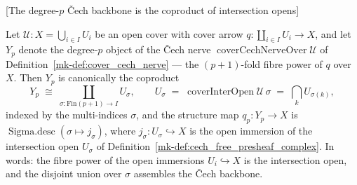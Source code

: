 \begin{lemma}

[The degree-\(p\) {\v C}ech backbone is the coproduct of intersection opens]
  \label{mk-lem:cech_backbone_left_sigma}

  Let \(\mathcal{U} : X = \bigcup_{i \in I} U_i\) be an open cover with cover arrow
  \(q : \coprod_{i \in I} U_i \to X\), and let \(Y_p\) denote the degree-\(p\) object of the
  {\v C}ech nerve \(\operatorname{coverCechNerveOver}\mathcal{U}\) of
  Definition~\ref{mk-def:cover_cech_nerve} --- the \((p+1)\)-fold fibre power of \(q\) over
  \(X\). Then \(Y_p\) is canonically the coproduct
  \[
    Y_p \;\cong\; \coprod_{\sigma : \mathrm{Fin}(p+1) \to I} U_\sigma,
    \qquad
    U_\sigma \;=\; \operatorname{coverInterOpen}\mathcal{U}\,\sigma \;=\;
      \bigcap_{k} U_{\sigma(k)},
  \]
  indexed by the multi-indices \(\sigma\), and the structure map \(q_p : Y_p \to X\) is
  \(\operatorname{Sigma.desc}(\sigma \mapsto j_\sigma)\), where
  \(j_\sigma : U_\sigma \hookrightarrow X\) is the open immersion of the intersection open
  \(U_\sigma\) of Definition~\ref{mk-def:cech_free_presheaf_complex}. In words: the fibre power
  of the open immersions \(U_i \hookrightarrow X\) is the intersection open, and the disjoint
  union over \(\sigma\) assembles the {\v C}ech backbone.
\end{lemma}
